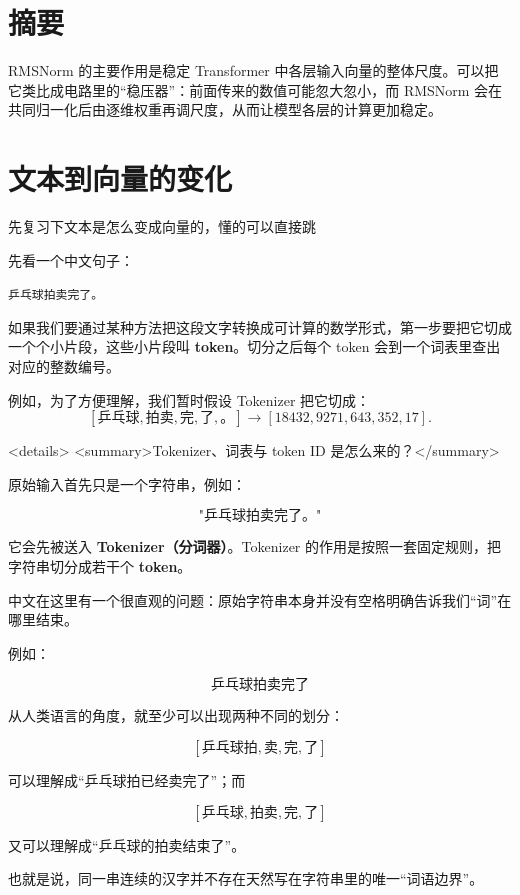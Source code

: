 \documentclass[UTF8,11pt,a4paper]{ctexart}
\title{\Huge RMSNorm：\[.35em]\Large 起一个稳压器的作用}
\begin{document}
\maketitle
\section{摘要}
RMSNorm 的主要作用是稳定 Transformer 中各层输入向量的整体尺度。可以把它类比成电路里的“稳压器”：前面传来的数值可能忽大忽小，而 RMSNorm 会在共同归一化后由逐维权重再调尺度，从而让模型各层的计算更加稳定。
\section{文本到向量的变化}
先复习下文本是怎么变成向量的，懂的可以直接跳

先看一个中文句子：
\begin{center}
\texttt{乒乓球拍卖完了。}
\end{center}

如果我们要通过某种方法把这段文字转换成可计算的数学形式，第一步要把它切成一个个小片段，这些小片段叫 \textbf{token}。切分之后每个 token 会到一个词表里查出对应的整数编号。

例如，为了方便理解，我们暂时假设 Tokenizer 把它切成：
\[
[\texttt{乒乓球},\texttt{拍卖},\texttt{完},
 \texttt{了},\texttt{。}]
\longrightarrow
[18432,9271,643,352,17].
\]

<details>
<summary>Tokenizer、词表与 token ID 是怎么来的？</summary>

原始输入首先只是一个字符串，例如：

\[
\texttt{"乒乓球拍卖完了。"}
\]

它会先被送入 \textbf{Tokenizer（分词器）}。Tokenizer 的作用是按照一套固定规则，把字符串切分成若干个 \textbf{token}。

中文在这里有一个很直观的问题：原始字符串本身并没有空格明确告诉我们“词”在哪里结束。

例如：

\[
\texttt{乒乓球拍卖完了}
\]

从人类语言的角度，就至少可以出现两种不同的划分：

\[
[\texttt{乒乓球拍},\texttt{卖},\texttt{完},\texttt{了}]
\]

可以理解成“乒乓球拍已经卖完了”；而

\[
[\texttt{乒乓球},\texttt{拍卖},\texttt{完},\texttt{了}]
\]

又可以理解成“乒乓球的拍卖结束了”。

也就是说，同一串连续的汉字并不存在天然写在字符串里的唯一“词语边界”。
\end{document}
